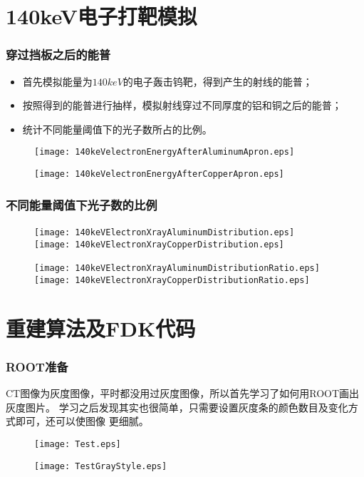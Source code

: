 \documentclass{beamer}
\begin{document}
\begin{CJK*}{UTF8}{gkai}
  \section{140keV电子打靶模拟}
  \begin{frame}\frametitle{穿过挡板之后的能普}
    \begin{minipage}[t]{0.29\textwidth}
      \liuhao
      \begin{itemize}
	\item 首先模拟能量为$140keV$的电子轰击钨靶，得到产生的射线的能普；
	\item 按照得到的能普进行抽样，模拟射线穿过不同厚度的铝和铜之后的能普；
	\item 统计不同能量阈值下的光子数所占的比例。
      \end{itemize}
    \end{minipage}
    \begin{minipage}[t]{0.7\textwidth}
      \vskip -0.4cm
      \begin{figure}[ht]
        \texttt{[image: 140keVelectronEnergyAfterAluminumApron.eps]}
        
	\texttt{[image: 140keVelectronEnergyAfterCopperApron.eps]}
      \end{figure}
    \end{minipage}
  \end{frame}
  \begin{frame}\frametitle{不同能量阈值下光子数的比例}
    \begin{figure}[ht]
      \texttt{[image: 140keVElectronXrayAluminumDistribution.eps]}~
      \texttt{[image: 140keVElectronXrayCopperDistribution.eps]}

      \texttt{[image: 140keVElectronXrayAluminumDistributionRatio.eps]}~
      \texttt{[image: 140keVElectronXrayCopperDistributionRatio.eps]}
    \end{figure}
  \end{frame}
  \section{重建算法及FDK代码}
  \begin{frame}\frametitle{ROOT准备}
    \begin{minipage}[t]{0.5\textwidth}
      \vskip 0.5cm
      \liuhao
      CT图像为灰度图像，平时都没用过灰度图像，所以首先学习了如何用ROOT画出灰度图片。
      学习之后发现其实也很简单，只需要设置灰度条的颜色数目及变化方式即可，还可以使图像
      更细腻。
      \vskip 0.5cm
      \begin{figure}[ht]
	\texttt{[image: Test.eps]}
      \end{figure}
    \end{minipage}
    \pause
    \begin{minipage}[t]{0.5\textwidth}
      \begin{figure}[ht]
	\texttt{[image: TestGrayStyle.eps]}


\end{figure}
\end{minipage}
\end{frame}
\end{CJK*}
\end{document}
